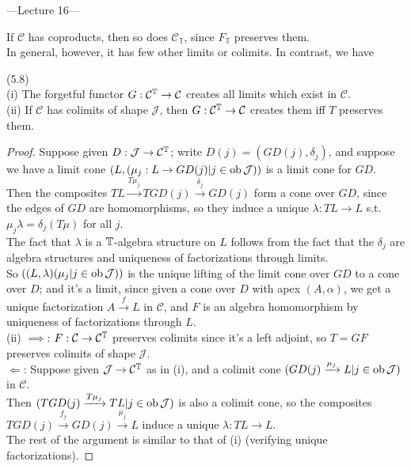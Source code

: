 \documentclass[a4paper]{article}
\begin{document}
---Lecture 16---

If $\mathcal{C}$ has coproducts, then so does $\mathcal{C}_\mathbb{T}$, since $F_\mathbb{T}$ preserves them.\\
In general, however, it has few other limits or colimits. In contrast, we have

\begin{thm} (5.8)\\
    (i) The forgetful functor $G:\mathcal{C}^{\mathbb{T}} \to \mathcal{C}$ creates all limits which exist in $\mathcal{C}$.\\
    (ii) If $\mathcal{C}$ has colimits of shape $\mathcal{J}$, then $G:\mathcal{C}^{\mathbb{T}} \to \mathcal{C}$ creates them iff $T$ preserves them.
    \begin{proof}
        Suppose given $D:\mathcal{J} \to \mathcal{C}^{\mathbb{T}}$; write $D(j) = (GD(j),\delta_j)$, and suppose we have a limit cone $(L,(\mu_j:L \to GD(j) | j \in \operatorname{ob}\mathcal{J}))$ is a limit cone for $GD$.\\
        Then the composites $TL \xrightarrow{T \mu_j} TGD(j) \xrightarrow{\delta_j} GD(j)$ form a cone over $GD$, since the edges of $GD$ are homomorphisms, so they induce a unique $\lambda:TL \to L$ s.t. $\mu_j \lambda = \delta_j(T\mu)$ for all $j$.\\
        The fact that $\lambda$ is a $\mathbb{T}$-algebra structure on $L$ follows from the fact that the $\delta_j$ are algebra structures and uniqueness of factorizations through limits.\\
        So $((L,\lambda)(\mu_j|j \in \operatorname{ob}\mathcal{J}))$ is the unique lifting of the limit cone over $GD$ to a cone over $D$; and it's a limit, since given a cone over $D$ with apex $(A,\alpha)$, we get a unique factorization $A \xrightarrow{f} L$ in $\mathcal{C}$, and $F$ is an algebra homomorphism by uniqueness of factorizations through $L$.\\
        (ii) $\implies$: $F:\mathcal{C} \to \mathcal{C}^{\mathbb{T}}$ preserves colimits since it's a left adjoint, so $T=GF$ preserves colimits of shape $\mathcal{J}$.\\
        $\Leftarrow$: Suppose given $\mathcal{J} \to \mathcal{C}^{\mathbb{T}}$ as in (i), and a colimit cone $(GD(j) \xrightarrow{\mu_j} L| j \in \operatorname{ob}\mathcal{J})$ in $\mathcal{C}$.\\
        Then $(TGD(j) \xrightarrow{T\mu_j} TL | j \in \operatorname{ob}\mathcal{J})$ is also a colimit cone, so the composites $TGD(j) \xrightarrow{f_j} GD(j) \xrightarrow{\mu_j} L$ induce a unique $\lambda:TL \to L$.\\
        The rest of the argument is similar to that of (i) (verifying unique factorizations).
    \end{proof}
\end{thm}
\end{document}
